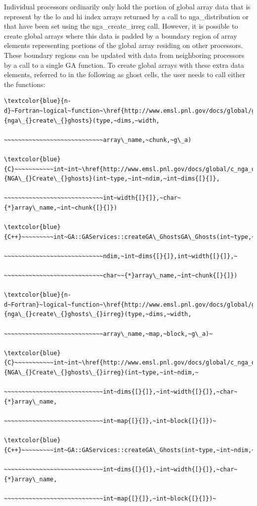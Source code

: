 Individual processors ordinarily only hold the portion of global array
data that is represent by the lo and hi index arrays returned by a
call to nga\_distribution or that have been set using the nga\_create\_irreg
call. However, it is possible to create global arrays where this data
is padded by a boundary region of array elements representing portions
of the global array residing on other processors. These boundary regions
can be updated with data from neighboring processors by a call to
a single GA function. To create global arrays with these extra data
elements, referred to in the following as ghost cells, the user needs
to call either the functions:
\begin{verbatim}
\textcolor{blue}{n-d}~Fortran~logical~function~\href{http://www.emsl.pnl.gov/docs/global/ga_ops.html\#ga_create_ghosts}{nga\_{}create\_{}ghosts}(type,~dims,~width,

~~~~~~~~~~~~~~~~~~~~~~~~~~~~array\_name,~chunk,~g\_a)

\textcolor{blue}{C}~~~~~~~~~~~int~int~\href{http://www.emsl.pnl.gov/docs/global/c_nga_ops.html\#nga_create_ghosts}{NGA\_{}Create\_{}ghosts}(int~type,~int~ndim,~int~dims{[}{]},

~~~~~~~~~~~~~~~~~~~~~~~~~~~~int~width{[}{]},~char~{*}array\_name,~int~chunk{[}{]})

\textcolor{blue}{C++}~~~~~~~~~int~GA::GAServices::createGA\_GhostsGA\_Ghosts(int~type,~int

~~~~~~~~~~~~~~~~~~~~~~~~~~~~ndim,~int~dims{[}{]},int~width{[}{]},~

~~~~~~~~~~~~~~~~~~~~~~~~~~~~char~~{*}array\_name,~int~chunk{[}{]})

\textcolor{blue}{n-d~Fortran}~logical~function~\href{http://www.emsl.pnl.gov/docs/global/ga_ops.html\#ga_create_ghosts_irreg}{nga\_{}create\_{}ghosts\_{}irreg}(type,~dims,~width,

~~~~~~~~~~~~~~~~~~~~~~~~~~~~array\_name,~map,~block,~g\_a)~

\textcolor{blue}{C}~~~~~~~~~~~int~int~\href{http://www.emsl.pnl.gov/docs/global/c_nga_ops.html\#nga_create_ghosts_irreg}{NGA\_{}Create\_{}ghosts\_{}irreg}(int~type,~int~ndim,~

~~~~~~~~~~~~~~~~~~~~~~~~~~~~int~dims{[}{]},~int~width{[}{]},~char~{*}array\_name,

~~~~~~~~~~~~~~~~~~~~~~~~~~~~int~map{[}{]},~int~block{[}{]})~

\textcolor{blue}{C++}~~~~~~~~~int~GA::GAServices::createGA\_Ghosts(int~type,~int~ndim,~

~~~~~~~~~~~~~~~~~~~~~~~~~~~~int~dims{[}{]},~int~width{[}{]},~char~{*}array\_name,

~~~~~~~~~~~~~~~~~~~~~~~~~~~~int~map{[}{]},~int~block{[}{]})~


\end{verbatim}

